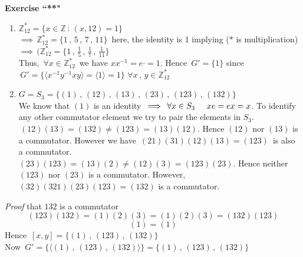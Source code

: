 \documentclass[11pt,a4paper]{article}
\theoremstyle{definition}
\begin{document}
\pagebreak
\textbf{Exercise ``**"}
\begin{enumerate}
\item $\mathbb{Z}^*_{12} = \{x\in \mathbb{Z}\, :\, (x,12) = 1\}$\\
$\implies\, \mathbb{Z}^*_{12} = \{1\, , \, 5\, , \, 7\, , \, 11\}\,$ here, the identity is 1 implying ($*$ is multiplication)\\
$\implies\, \big(\mathbb{Z}^*_{12} = \big\{1\, , \, \frac{1}{5}\, , \, \frac{1}{7}\, , \, \frac{1}{11}\big\}$\\

Thus, $\, \forall x\in \mathbb{Z}^*_{12}\,$ we have $xx^{-1} = e\cdot = 1$. Hence $\, G' = \{1\}$ since\\ $\, G' = \{\langle x^{-1}y^{-1}xy\rangle = \langle 1\rangle = 1\}\,\, \forall x\, ,\,y \in \mathbb{Z}^*_{12}$\\


\item $G = S_3 = \{(1)\, , \, (12)\, , \, (13)\, , \, (23)\,, \, (123)\, , \, (132)\}$\\
We know that $(1)$ is an identity $\, \implies\, \forall x\in S_3\hspace{0.5cm} xe = ex = x$. To identify any other commutator element we try to pair the elements in $S_3$.\\ $\, (12)(13) = (132)\ne (123) = (13)(12)$. Hence $(12)$ nor $(13)$ is a commutator. However we have $\, (21)(31)(12)(13) = (123)\,$ is also a commutator.\\
$(23)(123) = (13)(2)\neq (12)(3) = (123)(23)$. Hence neither $(123)$ nor $(23)$ is a commutator. However, $(32)(321)(23)(123) = (132)$ is a commutator.\\
\end{enumerate}


\textit{Proof} that  $132$ is a commutator
$$(123)(132) = (1)(2)(3) = (1)(2)(3) = (132)(123)$$
$$(1) = (1)$$
Hence $\, {[x,y]} = \{(1)\, , \, (123)\, , \, (132)\}$\\

Now $\, G' = \big\{\langle (1)\, , \, (123)\,  , \, (132)\rangle \big\} = \big\{(1)\, ,\, (123)\, , \, (132)\big\}$















\pagebreak
\end{document}
